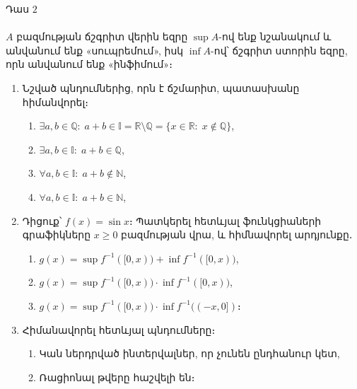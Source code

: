 \documentclass{article}
\begin{document}

Դաս $2$\\
\vspace{1cm}
\\
$A$ բազմության ճշգրիտ վերին եզրը $\sup A$-ով ենք նշանակում և անվանում ենք «սուպրեմում», իսկ $\inf A$-ով՝ ճշգրիտ ստորին եզրը, որն անվանում ենք «ինֆիմում»։\\
\vspace{1cm}
\begin{enumerate}
    \item Նշված պնդումներից, որն է ճշմարիտ, պատասխանը հիմանվորել։
    \begin{enumerate}
        \item $\exists a, b \in \mathbb{Q}: \; a + b \in \mathbb{I} = \mathbb{R} \setminus \mathbb{Q} = \{x \in \mathbb{R}: \; x \notin \mathbb{Q}\}$,
        \item $\exists a, b \in \mathbb{I}: \; a + b \in \mathbb{Q}$,
        \item $\forall a, b \in \mathbb{I}: \; a + b \notin \mathbb{N}$,
        \item $\forall a, b \in \mathbb{I}: \; a + b \in \mathbb{N}$,
    \end{enumerate}
    \item Դիցուք՝ $f(x) = \sin x$։ Պատկերել հետևյալ ֆունկցիաների գրաֆիկները $x \geq 0$ բազմության վրա, և հիմնավորել արդյունքը․
    \begin{enumerate}
        \item $g(x) = \sup f^{-1}([0, x)) + \inf f^{-1}([0, x))$,
        \item $g(x) = \sup f^{-1}([0, x)) \cdot \inf f^{-1}([0, x))$,
        \item $g(x) = \sup f^{-1}([0, x)) \cdot \inf f^{-1}((-x, 0])$։
    \end{enumerate}
    \item Հիմանավորել հետևյալ պնդումները։
    \begin{enumerate}
        \item Կան ներդրված ինտերվալներ, որ չունեն ընդհանուր կետ,
        \item Ռացիոնալ թվերը հաշվելի են։
    \end{enumerate}
\end{enumerate}
\end{document}
